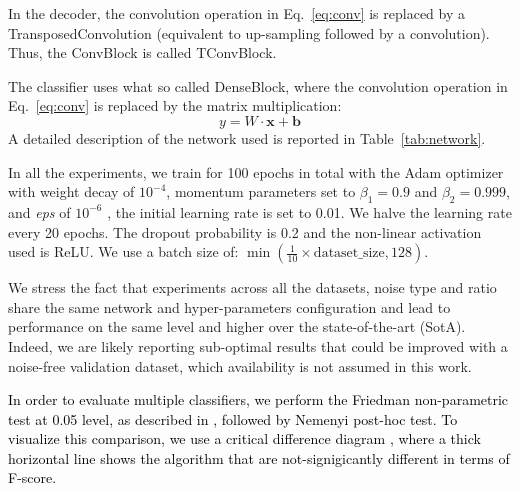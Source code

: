 \documentclass{llncs}
\newcommand{\new}[1]{\textcolor{black}{#1}}
\begin{document}
In the decoder, the convolution operation in Eq.~\ref{eq:conv} is replaced by a TransposedConvolution (equivalent to up-sampling followed by a convolution). 
Thus, the ConvBlock is called TConvBlock.

The classifier uses what so called DenseBlock, where the convolution operation in Eq.~\ref{eq:conv} is replaced by the matrix multiplication: 
\begin{equation}
    y = W \cdot \bm{x} + \bm{b}
\end{equation}
A detailed description of the network used is reported in Table~\ref{tab:network}.

In all the experiments, we train for 100 epochs in total with the Adam optimizer \cite{kingma2014adam} with weight decay of $10^{-4}$, momentum parameters set to $\beta_1=0.9$ and $\beta_2=0.999$, and \textit{eps} of $10^{-6}$ , the initial learning rate is set to 0.01. We halve the learning rate every 20 epochs. 
The dropout probability is 0.2 and the non-linear activation used is ReLU.
We use a batch size of: $\min(\frac{1}{10}\times \text{dataset\_size}, 128)$.

We stress the fact that experiments across all the datasets, noise type and ratio share the same network and hyper-parameters configuration and lead to performance on the same level and higher over the state-of-the-art (SotA).
Indeed, we are likely reporting sub-optimal results that could be improved with a noise-free validation dataset, which availability is not assumed in this work.

\new{In order to evaluate multiple classifiers, we perform the Friedman non-parametric test at 0.05 level, as described in  \cite{demvsar2006statistical}, followed by Nemenyi post-hoc test.
To visualize this comparison, we use a critical difference diagram \cite{demvsar2006statistical}, where a thick horizontal line shows the algorithm that are not-signigicantly different in terms of F-score.}
\end{document}
